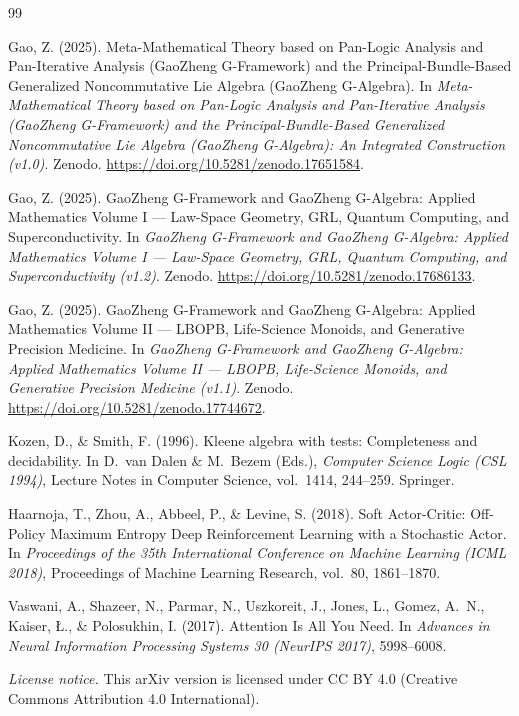 \documentclass[11pt]{book}
\theoremstyle{plain}
\theoremstyle{definition}
\theoremstyle{remark}
\begin{document}
\begin{thebibliography}{99}

{}

Gao, Z. (2025).
\newblock Meta-Mathematical Theory based on Pan-Logic Analysis and
Pan-Iterative Analysis (GaoZheng G-Framework) and the
Principal-Bundle-Based Generalized Noncommutative Lie Algebra
(GaoZheng G-Algebra).
\newblock In \emph{Meta-Mathematical Theory based on Pan-Logic Analysis and
Pan-Iterative Analysis (GaoZheng G-Framework) and the
Principal-Bundle-Based Generalized Noncommutative Lie Algebra
(GaoZheng G-Algebra): An Integrated Construction (v1.0)}.
\newblock Zenodo.
\newblock \url{https://doi.org/10.5281/zenodo.17651584}.

Gao, Z. (2025).
\newblock GaoZheng G-Framework and GaoZheng G-Algebra: Applied Mathematics Volume I — Law-Space Geometry, GRL, Quantum Computing, and Superconductivity.
\newblock In \emph{GaoZheng G-Framework and GaoZheng G-Algebra: Applied Mathematics Volume I — Law-Space Geometry, GRL, Quantum Computing, and Superconductivity (v1.2)}.
\newblock Zenodo.
\newblock \url{https://doi.org/10.5281/zenodo.17686133}.

Gao, Z. (2025).
\newblock GaoZheng G-Framework and GaoZheng G-Algebra: Applied Mathematics Volume II — LBOPB, Life-Science Monoids, and Generative Precision Medicine.
\newblock In \emph{GaoZheng G-Framework and GaoZheng G-Algebra: Applied Mathematics Volume II — LBOPB, Life-Science Monoids, and Generative Precision Medicine (v1.1)}.
\newblock Zenodo.
\newblock \url{https://doi.org/10.5281/zenodo.17744672}.



Kozen, D., \& Smith, F. (1996).
\newblock Kleene algebra with tests: Completeness and decidability.
\newblock In D.~van Dalen \& M.~Bezem (Eds.), \emph{Computer Science Logic (CSL 1994)}, Lecture Notes in Computer Science, vol.~1414, 244--259.
\newblock Springer.


Haarnoja, T., Zhou, A., Abbeel, P., \& Levine, S. (2018).
\newblock Soft Actor-Critic: Off-Policy Maximum Entropy Deep Reinforcement Learning with a Stochastic Actor.
\newblock In \emph{Proceedings of the 35th International Conference on Machine Learning (ICML 2018)}, Proceedings of Machine Learning Research, vol.~80, 1861--1870.


Vaswani, A., Shazeer, N., Parmar, N., Uszkoreit, J., Jones, L., Gomez, A.~N., Kaiser, {\L}., \& Polosukhin, I. (2017).
\newblock Attention Is All You Need.
\newblock In \emph{Advances in Neural Information Processing Systems 30 (NeurIPS 2017)}, 5998--6008.


\end{thebibliography}

\bigskip
\noindent
\textit{License notice.} This arXiv version is licensed under
CC BY 4.0 (Creative Commons Attribution 4.0 International).
\end{document}

